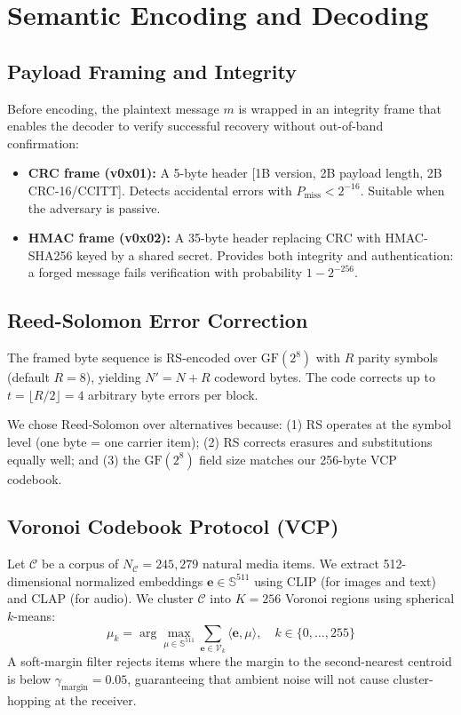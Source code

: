 \documentclass[conference]{IEEEtran}
\begin{document}
\section{Semantic Encoding and Decoding}

\subsection{Payload Framing and Integrity}

Before encoding, the plaintext message $m$ is wrapped in an integrity frame that enables the decoder to verify successful recovery without out-of-band confirmation:
\begin{itemize}
    \item \textbf{CRC frame (v0x01):} A 5-byte header [1B version, 2B payload length, 2B CRC-16/CCITT]. Detects accidental errors with $P_{\text{miss}} < 2^{-16}$. Suitable when the adversary is passive.
    \item \textbf{HMAC frame (v0x02):} A 35-byte header replacing CRC with HMAC-SHA256 keyed by a shared secret. Provides both integrity and authentication: a forged message fails verification with probability $1 - 2^{-256}$.
\end{itemize}

\subsection{Reed-Solomon Error Correction}

The framed byte sequence is RS-encoded over $\text{GF}(2^8)$ with $R$ parity symbols (default $R = 8$), yielding $N' = N + R$ codeword bytes. The code corrects up to $t = \lfloor R/2 \rfloor = 4$ arbitrary byte errors per block.

We chose Reed-Solomon over alternatives because: (1) RS operates at the symbol level (one byte = one carrier item); (2) RS corrects erasures and substitutions equally well; and (3) the $\text{GF}(2^8)$ field size matches our 256-byte VCP codebook.

\subsection{Voronoi Codebook Protocol (VCP)}

Let $\mathcal{C}$ be a corpus of $N_{\mathcal{C}} = 245,279$ natural media items. We extract 512-dimensional normalized embeddings $\mathbf{e} \in \mathbb{S}^{511}$ using CLIP (for images and text) and CLAP (for audio). We cluster $\mathcal{C}$ into $K = 256$ Voronoi regions using spherical $k$-means:
\begin{equation}
\mu_k = \arg\max_{\mu \in \mathbb{S}^{511}} \sum_{\mathbf{e} \in \mathcal{V}_k} \langle \mathbf{e}, \mu \rangle, \quad k \in \{0, \dots, 255\}
\end{equation}
A soft-margin filter rejects items where the margin to the second-nearest centroid is below $\gamma_{\text{margin}} = 0.05$, guaranteeing that ambient noise will not cause cluster-hopping at the receiver.
\end{document}

